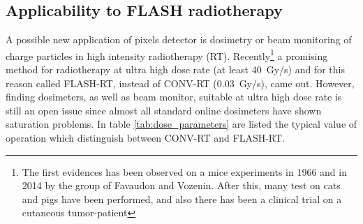     \subsection{Applicability to FLASH radiotherapy}
        A possible new application of pixels detector is dosimetry or beam monitoring of charge particles in high intensity radiotherapy (RT).
        Recently\footnote{The first evidences has been observed on a mice experiments in 1966 and in 2014 by the group of Favaudon and Vozenin. After this, many test on cats and pigs have been performed, and also there has been a clinical trial on a cutaneous tumor-patient} a promising method for radiotherapy at ultra high dose rate (at least \SI{40}{Gy/s}) and for this reason called FLASH-RT\cite{FLASH_review}, instead of CONV-RT (\SI{0.03}{Gy/s}), came out. However, finding dosimeters, as well as beam monitor, suitable at ultra high dose rate is still an open issue since almost all standard online dosimeters have shown saturation problems. In table \ref{tab:dose_parameters} are listed the typical value of operation which distinguish  between CONV-RT and FLASH-RT.

